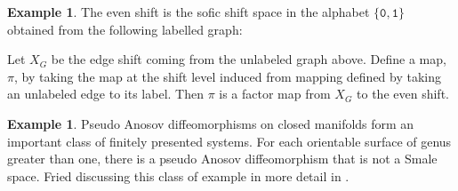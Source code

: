 \documentclass{amsart}
\renewcommand{\S}{\mathscr{S}}
\newcommand{\word}[1]{\mathtt{#1}}
\theoremstyle{plain}
\theoremstyle{definition}
\newtheorem{example}[theorem]{Example}
\theoremstyle{remark}
\begin{document}
\begin{example} \label{evenShiftExample}
The even shift is the sofic shift space in the alphabet $\{\word{0}, \word{1}\}$ obtained from the following labelled graph: 

\vspace{1em}
\begin{center}
\end{center}
Let $X_G$ be the edge shift coming from the unlabeled graph above. Define a map, $\pi$, by taking the map at the shift level induced from mapping defined by taking an unlabeled edge to its label. Then $\pi$ is a factor map from $X_G$ to the even shift.
\end{example}

\begin{example}
Pseudo Anosov diffeomorphisms on closed manifolds form an important class of finitely presented systems. For each orientable surface of genus greater than one, there is a pseudo Anosov diffeomorphism that is not a Smale space. Fried discussing this class of example in more detail in \cite{fried1987}.
\end{example}
\end{document}
